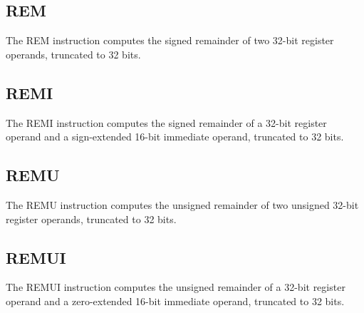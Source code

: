 \subsection{REM}

The REM instruction computes the signed remainder of two 32-bit register operands, truncated to 32 bits.\\


\begin{effectize}
\rdivzero
{}
\end{effectize}

\subsection{REMI}

The REMI instruction computes the signed remainder of a 32-bit register operand and a sign-extended 16-bit immediate operand, truncated to 32 bits.\\


\begin{effectize}
\idivzero
{}
\end{effectize}

\subsection{REMU}

The REMU instruction computes the unsigned remainder of two unsigned 32-bit register operands, truncated to 32 bits.\\


\begin{effectize}
\rdivzero
{}
\end{effectize}

\subsection{REMUI}

The REMUI instruction computes the unsigned remainder of a 32-bit register operand and a zero-extended 16-bit immediate operand, truncated to 32 bits.\\


